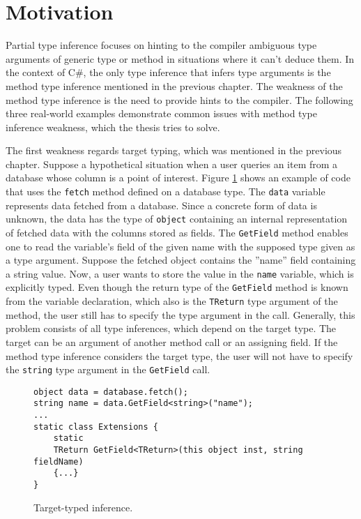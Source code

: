 \section{Motivation}
Partial type inference focuses on hinting to the compiler ambiguous type arguments of generic type or method in situations where it can’t deduce them. 
In the context of C\#, the only type inference that infers type arguments is the method type inference mentioned in the previous chapter. 
The weakness of the method type inference is the need to provide hints to the compiler. 
The following three real-world examples demonstrate common issues with method type inference weakness, which the thesis tries to solve.
\par
{}
The first weakness regards target typing, which was mentioned in the previous chapter. 
Suppose a hypothetical situation when a user queries an item from a database whose column is a point of interest. 
Figure \ref{img27:usecase1} shows an example of code that uses the \texttt{fetch} method defined on a database type. 
The \texttt{data} variable represents data fetched from a database. 
Since a concrete form of data is unknown, the data has the type of \texttt{object} containing an internal representation of fetched data with the columns stored as fields. 
The \texttt{GetField} method enables one to read the variable’s field of the given name with the supposed type given as a type argument. 
Suppose the fetched object contains the ”name” field containing a string value. 
Now, a user wants to store the value in the \texttt{name} variable, which is explicitly typed. 
Even though the return type of the \texttt{GetField} method is known from the variable declaration, which also is the \texttt{TReturn} type argument of the method, the user still has to specify the type argument in the call. 
Generally, this problem consists of all type inferences, which depend on the target type. The target can be an argument of another method call or an assigning field. 
If the method type inference considers the target type, the user will not have to specify the \texttt{string} type argument in the \texttt{GetField} call.
\begin{figure}[h]
\begin{lstlisting}[style=csharp]
object data = database.fetch();
string name = data.GetField<string>("name");
...
static class Extensions {
    static 
    TReturn GetField<TReturn>(this object inst, string fieldName) 
    {...}
}
\end{lstlisting}
\caption{Target-typed inference.}
\label{img27:usecase1}
\end{figure}
